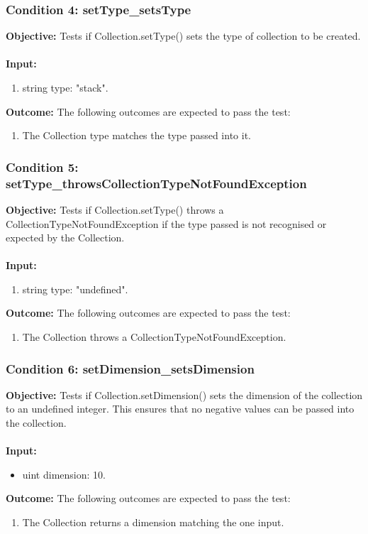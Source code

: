 \documentclass[a4paper,12pt]{article}
\begin{document}
		\subsubsection{Condition 4: setType\_setsType}
			\textbf{Objective:} Tests if Collection.setType() sets the type of collection to be created.\\\\
			\textbf{Input:}  
				\begin{enumerate}
					\item string type: "stack".
				\end{enumerate}
			\textbf{Outcome:} The following outcomes are expected to pass the test:
				\begin{enumerate}
					\item The Collection type matches the type passed into it.
				\end{enumerate}
		\subsubsection{Condition 5: setType\_throwsCollectionTypeNotFoundException}
			\textbf{Objective:} Tests if Collection.setType() throws a CollectionTypeNotFoundException if the type passed is not recognised or expected by the Collection.\\\\
			\textbf{Input:} 
				\begin{enumerate}
					\item string type: "undefined".
				\end{enumerate}
			\textbf{Outcome:} The following outcomes are expected to pass the test:
				\begin{enumerate}
					\item The Collection throws a CollectionTypeNotFoundException.
				\end{enumerate}
		\subsubsection{Condition 6: setDimension\_setsDimension}
			\textbf{Objective:} Tests if Collection.setDimension() sets the dimension of the collection to an undefined integer. This ensures that no negative values can be passed into the collection.\\\\
			\textbf{Input:}  
				\begin{itemize}
					\item uint dimension: 10.
				\end{itemize}
			\textbf{Outcome:} The following outcomes are expected to pass the test:
				\begin{enumerate}
					\item The Collection returns a dimension matching the one input.
				\end{enumerate}
\end{document}
